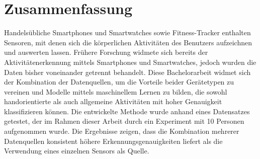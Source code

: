 \chapter*{Zusammenfassung}
Handelsübliche Smartphones und Smartwatches sowie Fitness-Tracker enthalten Sensoren, mit denen sich die körperlichen Aktivitäten des Benutzers aufzeichnen und auswerten lassen. Frühere Forschung widmete sich bereits der Aktivitätenerkennung mittels Smartphones und Smartwatches, jedoch wurden die Daten bisher voneinander getrennt behandelt. Diese Bachelorarbeit widmet sich der Kombination der Datenquellen, um die Vorteile beider Gerätetypen zu vereinen und Modelle mittels maschinellem Lernen zu bilden, die sowohl handorientierte als auch allgemeine Aktivitäten mit hoher Genauigkeit klassifizieren können. Die entwickelte Methode wurde anhand eines Datensatzes getestet, der im Rahmen dieser Arbeit durch ein Experiment mit 10 Personen aufgenommen wurde. Die Ergebnisse zeigen, dass die Kombination mehrerer Datenquellen konsistent höhere Erkennungsgenauigkeiten liefert als die Verwendung eines einzelnen Sensors als Quelle.

